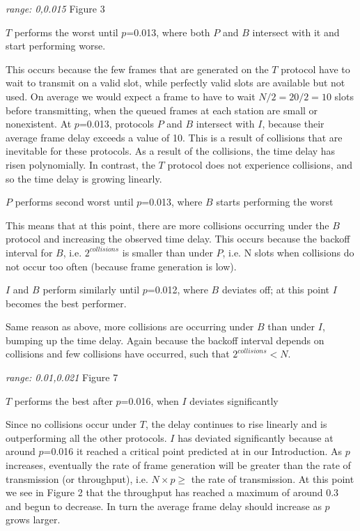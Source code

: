 \documentclass[twocolumn]{article}
\begin{document}
\emph{range: 0,0.015} Figure 3

$T$ performs the worst until $p$=0.013, where both $P$ and $B$ intersect with it and start performing worse.

This occurs because the few frames that are generated on the $T$ protocol have to wait to transmit on a valid slot,
while perfectly valid slots are available but not used. On average we would expect a frame to have to wait $N/2 = 20/2 = 10$
slots before transmitting, when the queued frames at each station are small or nonexistent. At $p$=0.013, protocols $P$
and $B$ intersect with $I$, because their average frame delay exceeds a value of 10. This is a result of collisions
that are inevitable for these protocols. As a result of the collisions, the time delay has risen polynomially. In contrast,
the $T$ protocol does not experience collisions, and so the time delay is growing linearly.

$P$ performs second worst until $p$=0.013, where $B$ starts performing the worst

This means that at this point, there are more collisions occurring under the $B$ protocol and increasing the
observed time delay. This occurs because the backoff interval for $B$, i.e. $2^{collisions}$ is smaller than under $P$, i.e. N slots when collisions do not
occur too often (because frame generation is low).

$I$ and $B$ perform similarly until $p$=0.012, where $B$ deviates off; at this point $I$ becomes the 
best performer.

Same reason as above, more collisions are occurring under $B$ than under $I$, bumping up the time delay. Again because
the backoff interval depends on collisions and few collisions have occurred, such that $2^{collisions} < N$.

\emph{range: 0.01,0.021} Figure 7

$T$ performs the best after $p$=0.016, when $I$ deviates significantly

Since no collisions occur under $T$, the delay continues to rise linearly and is outperforming all the other
protocols. $I$ has deviated significantly because at around $p$=0.016 it reached a critical point predicted at
in our Introduction. As $p$ increases, eventually the rate of frame generation will be greater than the rate of
transmission (or throughput), i.e. $N\times p \geq$ the rate of transmission. At this point we see in 
Figure 2 that the throughput has reached a maximum of around 0.3 and begun to decrease. In turn the average frame
delay should increase as $p$ grows larger.
\end{document}
